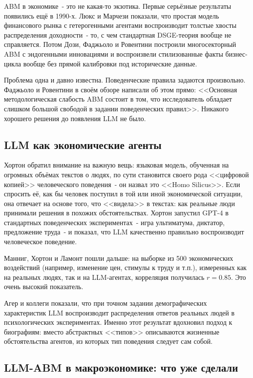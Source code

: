 \documentclass[12pt, a4paper]{article}
\begin{document}
ABM в экономике~- это не какая-то экзотика. Первые серьёзные результаты появились ещё в 1990-х. Люкс и Марчези \cite{lux1999} показали, что простая модель финансового рынка с гетерогенными агентами воспроизводит толстые хвосты распределения доходности~- то, с чем стандартная DSGE-теория вообще не справляется. Потом Дози, Фаджьоло и Ровентини \cite{dosi2010} построили многосекторный ABM с эндогенными инновациями и воспроизвели стилизованные факты бизнес-цикла вообще без прямой калибровки под исторические данные.

Проблема одна и давно известна. Поведенческие правила задаются произвольно. Фаджьоло и Ровентини \cite{fagiolo2017} в своём обзоре написали об этом прямо: <<Основная методологическая слабость ABM состоит в том, что исследователь обладает слишком большой свободой в задании поведенческих правил>>. Никакого хорошего решения до появления LLM не было.

\subsection{LLM как экономические агенты}

Хортон \cite{horton2023} обратил внимание на важную вещь: языковая модель, обученная на огромных объёмах текстов о людях, по сути становится своего рода <<цифровой копией>> человеческого поведения~- он назвал это <<Homo Silicus>>. Если спросить её, как бы человек поступил в той или иной экономической ситуации, она отвечает на основе того, что <<видела>> в текстах: как реальные люди принимали решения в похожих обстоятельствах. Хортон запустил GPT-4 в стандартных поведенческих экспериментах~- игра ультиматума, диктатор, предложение труда~- и показал, что LLM качественно правильно воспроизводит человеческое поведение.

Манниг, Хортон и Ламонт \cite{manning2024} пошли дальше: на выборке из 500 экономических воздействий (например, изменение цен, стимулы к труду и т.п.), измеренных как на реальных людях, так и на LLM-агентах, корреляция получилась $r = 0.85$. Это очень высокий показатель.

Агер и коллеги \cite{aher2023} показали, что при точном задании демографических характеристик LLM воспроизводит распределения ответов реальных людей в психологических экспериментах. Именно этот результат вдохновил подход к биографиям: вместо абстрактных <<типов>> описываются жизненные обстоятельства агентов, из которых тип поведения следует сам собой.

\subsection{LLM-ABM в макроэкономике: что уже сделали}
\end{document}
